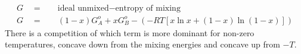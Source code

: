 \documentclass[../hand-in3.tex]{subfiles}
\begin{document}
\begin{align}
G \quad =& \quad \text{ideal unmixed} - \text{entropy of mixing}\\ 
G \quad =& \quad (1-x)G_A^o + xG_B^o - \left(- RT \left[ x \ln x + (1-x) \ln (1-x) \right] \right)
\end{align} 
There is a competition of which term is more dominant for non-zero temperatures, concave down from the mixing energies and concave up from $-T$.
\end{document}
